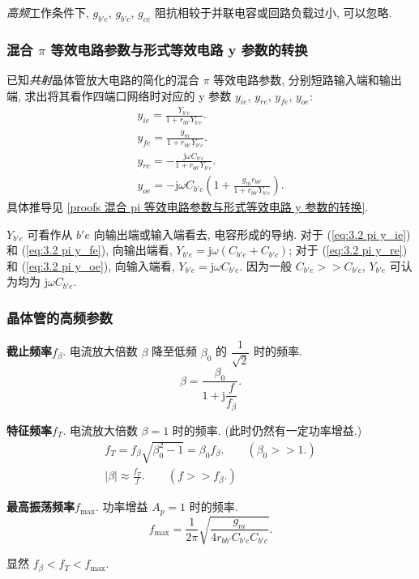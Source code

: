 \textit{高频}工作条件下, $g_{b'e}$, $g_{b'c}$, $g_{ce}$ 阻抗相较于并联电容或回路负载过小, 可以忽略.

\subsubsection{混合 \texorpdfstring{$\pi$}{pi} 等效电路参数与形式等效电路 y 参数的转换}

已知\textit{共射}晶体管放大电路的简化的混合 $\pi$ 等效电路参数, 分别短路输入端和输出端, 求出将其看作四端口网络时对应的 y 参数 $y_{ie}$, $y_{re}$, $y_{fe}$, $y_{oe}$:
\begin{gather}
    y_{ie}=\frac{Y_{b'e}}{1+r_{bb'}Y_{b'e}}. \label{eq:3.2 pi y_ie} \\
    y_{fe}=\frac{g_m}{1+r_{bb'}Y_{b'e}}. \label{eq:3.2 pi y_fe} \\
    y_{re}=-\frac{\mathrm{j}\omega C_{b'c}}{1+r_{bb'}Y_{b'e}}. \label{eq:3.2 pi y_re} \\
    y_{oe}=-\mathrm{j}\omega C_{b'c}\left(1+\frac{g_mr_{bb'}}{1+r_{bb'}Y_{b'e}}\right). \label{eq:3.2 pi y_oe}
\end{gather}
具体推导见 \ref{proofs 混合 pi 等效电路参数与形式等效电路 y 参数的转换}.

$Y_{b'e}$ 可看作从 $b'e$ 向输出端或输入端看去, 电容形成的导纳. 对于 (\ref{eq:3.2 pi y_ie}) 和 (\ref{eq:3.2 pi y_fe}), 向输出端看, $Y_{b'e}=\mathrm{j}\omega(C_{b'e}+C_{b'c})$; 对于 (\ref{eq:3.2 pi y_re}) 和 (\ref{eq:3.2 pi y_oe}), 向输入端看, $Y_{b'e}=\mathrm{j}\omega C_{b'e}$. 因为一般 $C_{b'e}>>C_{b'c}$, $Y_{b'e}$ 可认为均为 $\mathrm{j}\omega C_{b'e}$.

\subsubsection{晶体管的高频参数}

\textbf{截止频率}\quad $f_\beta$. 电流放大倍数 $\beta$ 降至低频 $\beta_0$ 的 $\dfrac{1}{\sqrt{2}}$ 时的频率.
\begin{equation}
    \beta=\frac{\beta_0}{1+\mathrm{j}\dfrac{f}{f_\beta}}.
\end{equation}

\textbf{特征频率}\quad $f_T$. 电流放大倍数 $\beta=1$ 时的频率. (此时仍然有一定功率增益.)
\begin{gather}
    f_T=f_\beta\sqrt{\beta_0^2-1}=\beta_0 f_\beta.\qquad (\beta_0>>1.) \label{eq:3.2 f_T} \\
    |\beta|\approx\frac{f_T}{f}.\qquad (f>>f_\beta.) \label{eq:3.2 f_T beta}
\end{gather}

\textbf{最高振荡频率}\quad $f_\mathrm{max}$. 功率增益 $A_p=1$ 时的频率.
\begin{equation}
    f_\mathrm{max}=\frac{1}{2\pi}\sqrt{\frac{g_m}{4r_{bb'}C_{b'e}C_{b'c}}}.
\end{equation}

显然 $f_\beta<f_T<f_\mathrm{max}$.
